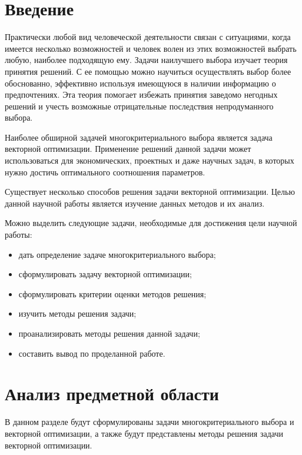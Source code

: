 \documentclass[a4paper,14pt]{report}
\begin{document}
\fontsize{14}{16pt}


\def\contentsname{Содержание}
%
\tableofcontents

\newpage
\chapter*{Введение}
Практически любой вид человеческой деятельности связан с ситуациями, когда имеется несколько возможностей и человек волен из этих возможностей выбрать любую, наиболее подходящую ему.
Задачи наилучшего выбора изучает теория принятия решений. С ее помощью можно
научиться осуществлять выбор более обоснованно, эффективно используя имеющуюся в наличии информацию о предпочтениях. Эта теория помогает избежать принятия заведомо негодных решений и учесть возможные отрицательные последствия непродуманного выбора.

Наиболее обширной задачей многокритериального выбора является задача векторной оптимизации. Применение решений данной задачи может использоваться для экономических, проектных и даже научных задач, в которых нужно достичь оптимального соотношения параметров.

Существует несколько способов решения задачи векторной оптимизации. Целью данной научной работы является изучение данных методов и их анализ.

Можно выделить следующие задачи, необходимые для достижения цели научной работы:
\begin{itemize}
	\item дать определение задаче многокритериального выбора;
    \item сформулировать задачу векторной оптимизации;
    \item сформулировать критерии оценки методов решения;
    \item изучить методы решения задачи;
    \item проанализировать методы решения данной задачи;
    \item составить вывод по проделанной работе.
\end{itemize}

\newpage
\chapter{Анализ предметной области}
В данном разделе будут сформулированы задачи многокритериального выбора и векторной оптимизации, а также будут представлены методы решения задачи векторной оптимизации.
\end{document}
